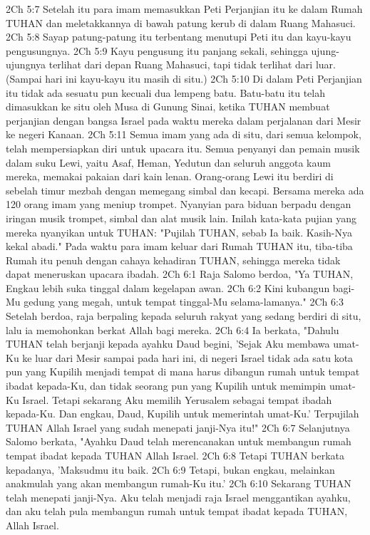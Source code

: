 2Ch 5:7  Setelah itu para imam memasukkan Peti Perjanjian itu ke dalam Rumah TUHAN dan meletakkannya di bawah patung kerub di dalam Ruang Mahasuci.
2Ch 5:8  Sayap patung-patung itu terbentang menutupi Peti itu dan kayu-kayu pengusungnya.
2Ch 5:9  Kayu pengusung itu panjang sekali, sehingga ujung-ujungnya terlihat dari depan Ruang Mahasuci, tapi tidak terlihat dari luar. (Sampai hari ini kayu-kayu itu masih di situ.)
2Ch 5:10  Di dalam Peti Perjanjian itu tidak ada sesuatu pun kecuali dua lempeng batu. Batu-batu itu telah dimasukkan ke situ oleh Musa di Gunung Sinai, ketika TUHAN membuat perjanjian dengan bangsa Israel pada waktu mereka dalam perjalanan dari Mesir ke negeri Kanaan.
2Ch 5:11  Semua imam yang ada di situ, dari semua kelompok, telah mempersiapkan diri untuk upacara itu. Semua penyanyi dan pemain musik dalam suku Lewi, yaitu Asaf, Heman, Yedutun dan seluruh anggota kaum mereka, memakai pakaian dari kain lenan. Orang-orang Lewi itu berdiri di sebelah timur mezbah dengan memegang simbal dan kecapi. Bersama mereka ada 120 orang imam yang meniup trompet. Nyanyian para biduan berpadu dengan iringan musik trompet, simbal dan alat musik lain. Inilah kata-kata pujian yang mereka nyanyikan untuk TUHAN: "Pujilah TUHAN, sebab Ia baik. Kasih-Nya kekal abadi." Pada waktu para imam keluar dari Rumah TUHAN itu, tiba-tiba Rumah itu penuh dengan cahaya kehadiran TUHAN, sehingga mereka tidak dapat meneruskan upacara ibadah.
2Ch 6:1  Raja Salomo berdoa, "Ya TUHAN, Engkau lebih suka tinggal dalam kegelapan awan.
2Ch 6:2  Kini kubangun bagi-Mu gedung yang megah, untuk tempat tinggal-Mu selama-lamanya."
2Ch 6:3  Setelah berdoa, raja berpaling kepada seluruh rakyat yang sedang berdiri di situ, lalu ia memohonkan berkat Allah bagi mereka.
2Ch 6:4  Ia berkata, "Dahulu TUHAN telah berjanji kepada ayahku Daud begini, 'Sejak Aku membawa umat-Ku ke luar dari Mesir sampai pada hari ini, di negeri Israel tidak ada satu kota pun yang Kupilih menjadi tempat di mana harus dibangun rumah untuk tempat ibadat kepada-Ku, dan tidak seorang pun yang Kupilih untuk memimpin umat-Ku Israel. Tetapi sekarang Aku memilih Yerusalem sebagai tempat ibadah kepada-Ku. Dan engkau, Daud, Kupilih untuk memerintah umat-Ku.' Terpujilah TUHAN Allah Israel yang sudah menepati janji-Nya itu!"
2Ch 6:7  Selanjutnya Salomo berkata, "Ayahku Daud telah merencanakan untuk membangun rumah tempat ibadat kepada TUHAN Allah Israel.
2Ch 6:8  Tetapi TUHAN berkata kepadanya, 'Maksudmu itu baik.
2Ch 6:9  Tetapi, bukan engkau, melainkan anakmulah yang akan membangun rumah-Ku itu.'
2Ch 6:10  Sekarang TUHAN telah menepati janji-Nya. Aku telah menjadi raja Israel menggantikan ayahku, dan aku telah pula membangun rumah untuk tempat ibadat kepada TUHAN, Allah Israel.
